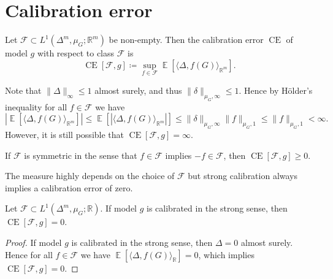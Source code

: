 \documentclass{article}
\DeclareMathOperator{\Expect}{\mathbb{E}}
\DeclareMathOperator{\measure}{CE}
\begin{document}
\section{Calibration error}

\begin{definition}
  Let $\mathcal{F} \subset L^1(\Delta^m, \mu_G; \mathbb{R}^m)$ be non-empty.
  Then the calibration error $\measure$ of model $g$ with respect to class
  $\mathcal{F}$ is
  \begin{equation*}
    \measure[\mathcal{F}, g]  \coloneqq \sup_{f \in \mathcal{F}} \Expect\left[\langle \Delta, f(G) \rangle_{\mathbb{R}^m}\right].
  \end{equation*}
\end{definition}

\begin{remark}\label{remark:exists}
  Note that $\|\Delta\|_{\infty} \leq 1$ almost surely, and thus
  $\|\delta\|_{\mu_G,\infty} \leq 1$. Hence by Hölder's inequality for all
  $f \in \mathcal{F}$ we have
  \begin{equation*}
    |\Expect[\langle \Delta, f(G) \rangle_{\mathbb{R}^m}]| \leq \Expect[|\langle \Delta, f(G) \rangle_{\mathbb{R}^m}|] \leq \|\delta\|_{\mu_G,\infty} \|f\|_{\mu_G,1} \leq \|f\|_{\mu_G,1} < \infty.
  \end{equation*}
  However, it is still possible that $\measure[\mathcal{F}, g] = \infty$.
\end{remark}

\begin{remark}\label{remark:positive}
  If $\mathcal{F}$ is symmetric in the sense that $f \in \mathcal{F}$ implies
  $-f \in \mathcal{F}$, then $\measure[\mathcal{F}, g] \geq 0$.
\end{remark}

The measure highly depends on the choice of $\mathcal{F}$ but strong calibration
always implies a calibration error of zero.

\begin{theorem}\label{thm:ce_zero}
  Let $\mathcal{F} \subset L^1(\Delta^m,\mu_G;\mathbb{R})$. If model $g$ is
  calibrated in the strong sense, then $\measure[\mathcal{F}, g] = 0$.
\end{theorem}

\begin{proof}
  If model $g$ is calibrated in the strong sense, then $\Delta = 0$ almost
  surely. Hence for all $f \in \mathcal{F}$ we have
  $\Expect[\langle \Delta, f(G)\rangle_{\mathbb{R}}] = 0$, which implies
  $\measure[\mathcal{F}, g] = 0$.
\end{proof}
\end{document}
